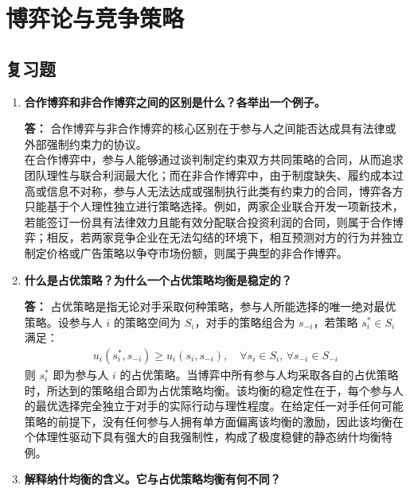	\chapter{博弈论与竞争策略}
	
	\section{复习题}
	\begin{enumerate}[label=\textbf{\arabic*.}, leftmargin=*]
		\item \textbf{合作博弈和非合作博弈之间的区别是什么？各举出一个例子。}
		
		\textbf{答：}
		合作博弈与非合作博弈的核心区别在于参与人之间能否达成具有法律或外部强制约束力的协议。\\在合作博弈中，参与人能够通过谈判制定约束双方共同策略的合同，从而追求团队理性与联合利润最大化；而在非合作博弈中，由于制度缺失、履约成本过高或信息不对称，参与人无法达成或强制执行此类有约束力的合同，博弈各方只能基于个人理性独立进行策略选择。例如，两家企业联合开发一项新技术，若能签订一份具有法律效力且能有效分配联合投资利润的合同，则属于合作博弈；相反，若两家竞争企业在无法勾结的环境下，相互预测对方的行为并独立制定价格或广告策略以争夺市场份额，则属于典型的非合作博弈。
		
		\item \textbf{什么是占优策略？为什么一个占优策略均衡是稳定的？}
		
		\textbf{答：}
		占优策略是指无论对手采取何种策略，参与人所能选择的唯一绝对最优策略。设参与人 $i$ 的策略空间为 $S_i$，对手的策略组合为 $s_{-i}$，若策略 $s_i^* \in S_i$ 满足：
		\[
		\begin{aligned}
			u_i(s_i^*, s_{-i}) \ge u_i(s_i, s_{-i}), \quad \forall s_i \in S_i, \, \forall s_{-i} \in S_{-i}
		\end{aligned}
		\]
		则 $s_i^*$ 即为参与人 $i$ 的占优策略。当博弈中所有参与人均采取各自的占优策略时，所达到的策略组合即为占优策略均衡。该均衡的稳定性在于，每个参与人的最优选择完全独立于对手的实际行动与理性程度。在给定任一对手任何可能策略的前提下，没有任何参与人拥有单方面偏离该均衡的激励，因此该均衡在个体理性驱动下具有强大的自我强制性，构成了极度稳健的静态纳什均衡特例。
		
		\item \textbf{解释纳什均衡的含义。它与占优策略均衡有何不同？}
		

\end{enumerate}
